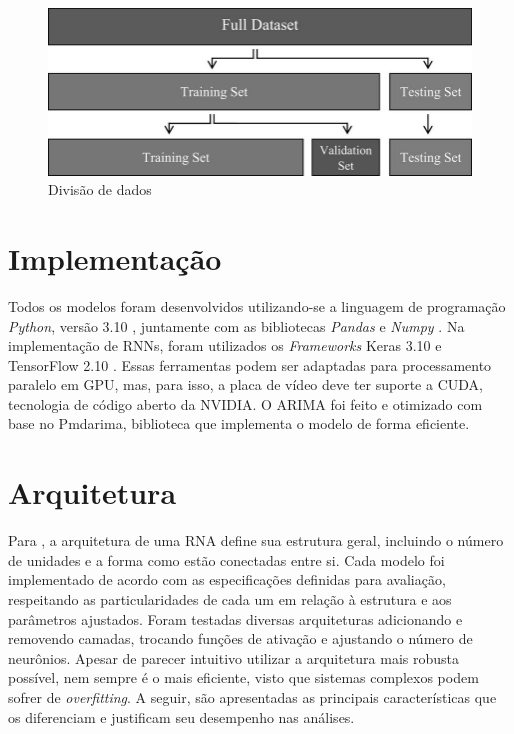 \begin{figure}[!htb] \centering
    \caption{Divisão de dados} \label{figura:train_test}
    \begin{varwidth}{\linewidth}
      \includegraphics[width=12cm]{figuras/train_test.png}
    \end{varwidth}
\end{figure}

\section{Implementação} \label{sec:implementacao}
Todos os modelos foram desenvolvidos utilizando-se a linguagem de programação \textit{Python}, versão 3.10 \cite{ramalho}, juntamente com as bibliotecas \textit{Pandas} e \textit{Numpy} \cite{Data}. 
Na implementação de RNNs, foram utilizados os \textit{Frameworks} Keras 3.10 e TensorFlow 2.10 \cite{maosaobra}. Essas ferramentas podem ser adaptadas para processamento paralelo em GPU, mas, para isso, a placa de vídeo deve ter suporte a CUDA, tecnologia de código aberto da NVIDIA.
O ARIMA foi feito e otimizado com base no Pmdarima, biblioteca que implementa o modelo de forma eficiente.

\section{Arquitetura} \label{sec:arquitetura}
Para \textcite{Good}, a arquitetura de uma RNA define sua estrutura geral, incluindo o número de unidades e a forma como estão conectadas entre si.
Cada modelo foi implementado de acordo com as especificações definidas para avaliação, respeitando as particularidades de cada um em relação à estrutura e aos parâmetros ajustados.
Foram testadas diversas arquiteturas adicionando e removendo camadas, trocando funções de ativação e ajustando o número de neurônios.
Apesar de parecer intuitivo utilizar a arquitetura mais robusta possível, nem sempre é o mais eficiente, visto que sistemas complexos podem sofrer de \textit{overfitting}.
A seguir, são apresentadas as principais características que os diferenciam e justificam seu desempenho nas análises.

